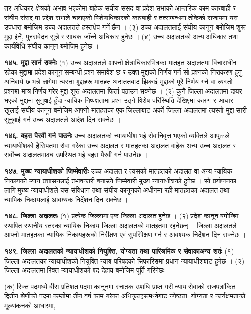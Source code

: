 तर अधिकार क्षेत्रको अभाव भएकोमा बाहेक संघीय संसद वा प्रदेश सभाको आन्तरिक काम कारबाही र संघीय संसद वा प्रदेश सभाले चलाएको विशेषाधिकारको कारबाही र तत्सम्बन्धमा तोकेको सजायमा यस उपधारा बमोजिम उच्च अदालतले हस्तक्षेप गर्ने छैन ।
(३) उच्च अदालतलाई संघीय कानून बमोजिम शुरू मुद्दा हेर्ने, पुनरावेदन सुन्ने र साधक जाँच्ने अधिकार हुनेछ ।
(४) उच्च अदालतको अन्य अधिकार तथा कार्यविधि संघीय कानून बमोजिम हुनेछ ।

\textbf{१४५. मुद्दा सार्न सक्नेः} (१) उच्च अदालतले आफ्नो क्षेत्राधिकारभित्रका मातहत अदालतमा विचाराधीन रहेका मुद्दामा प्रदेश कानून सम्बन्धी प्रश्न समावेश छ र उक्त मुद्दाको निर्णय गर्न सो प्रश्नको निराकरण हुनु अनिवार्य छ भन्ने लागेमा त्यस्ता मुद्दाहरू मातहत अदालतबाट झिकाई मुद्दाको पूरै निर्णय गर्न वा त्यस्तो प्रश्नमा मात्र निर्णय गरेर मुद्दा शुरू अदालतमा फिर्ता पठाउन सक्नेछ ।
(२) कुनै जिल्ला अदालतमा दायर भएको मुद्दामा सुनुवाई हुँदा न्यायिक निष्पक्षतामा प्रश्न उठ्ने विशेष परिस्थिति देखिएमा कारण र आधार खुलाई संघीय कानून बमोजिम आफ्नो मातहतका एक जिल्लाबाट अर्को जिल्ला अदालतमा त्यस्तो मुद्दा सारी सुनुवाई गर्न उच्च अदालतले आदेश दिन सक्नेछ ।

\textbf{१४६. बहस पैरवी गर्न पाउनेः} उच्च अदालतको न्यायाधीश भई सेवानिवृत्त भएको व्यक्तिले आपूmले न्यायाधीशको हैसियतमा सेवा गरेका उच्च अदालत र मातहतका अदालत बाहेक अन्य उच्च अदालत र सर्वोच्च अदालतमाठघ उपस्थित भई बहस पैरवी गर्न पाउनेछ ।

\textbf{१४७. मुख्य न्यायाधीशको जिम्मेवारीः} उच्च अदालत र त्यसको मातहतको अदालत वा अन्य न्यायिक निकायको न्याय प्रशासनलाई प्रभावकारी बनाउने जिम्मेवारी मुख्य न्यायाधीशको हुनेछ । सो प्रयोजनका लागि मुख्य न्यायाधीशले यस संविधान तथा संघीय कानूनको अधीनमा रही मातहतका अदालत तथा न्यायिक निकायलाई आवश्यक निर्देशन दिन सक्नेछ ।

\textbf{१४८. जिल्ला अदालतः} (१) प्रत्येक जिल्लामा एक जिल्ला अदालत हुनेछ ।
(२) प्रदेश कानून बमोजिम स्थापित स्थानीय स्तरका न्यायिक निकाय जिल्ला अदालतको मातहतमा रहनेछन् । जिल्ला अदालतले आफ्नो मातहतका न्यायिक निकायहरूको निरीक्षण एवं सुपरिवेक्षण गर्न र आवश्यक निर्देशन दिन सक्नेछ ।

\textbf{१४९. जिल्ला अदालतको न्यायाधीशको नियुक्ति, योग्यता तथा पारिश्रमिक र सेवाकाअन्य शर्तः} (१) जिल्ला अदालतका न्यायाधीशको नियुक्ति न्याय परिषदको सिफारिसमा प्रधान न्यायाधीशबाट हुनेछ ।
(२) जिल्ला अदालतमा रिक्त न्यायाधीशको पद देहाय बमोजिम पूर्ति गरिनेछः–

(क) रिक्त पदमध्ये बीस प्रतिशत पदमा कानूनमा स्नातक उपाधि प्राप्त गरी न्याय सेवाको राजपत्रांकित द्वितीय श्रेणीको पदमा कम्तीमा तीन वर्ष काम गरेका अधिकृतहरूमध्येबाट ज्येष्ठता, योग्यता र कार्यक्षमताको मूल्यांकनको आधारमा,

